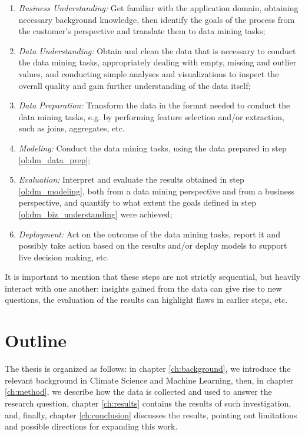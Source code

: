 \documentclass[a4paper,11pt]{kth-mag}
\begin{document}
\begin{enumerate}
\item \emph{Business Understanding:} Get familiar with the application domain, obtaining necessary background knowledge, then identify the goals of the process from the customer's perspective and translate them to data mining tasks;
\label{ol:dm_biz_understanding}

\item \emph{Data Understanding:} Obtain and clean the data that is necessary to conduct the data mining tasks, appropriately dealing with empty, missing and outlier values, and conducting simple analyses and visualizations to inspect the overall quality and gain further understanding of the data itself;
\label{ol:dm_data_understanding}

\item \emph{Data Preparation:} Transform the data in the format needed to conduct the data mining tasks, e.g. by performing feature selection and/or extraction, such as joins, aggregates, etc.
\label{ol:dm_data_prep}

\item \emph{Modeling:} Conduct the data mining tasks, using the data prepared in step \ref{ol:dm_data_prep};
\label{ol:dm_modeling}

\item \emph{Evaluation:} Interpret and evaluate the results obtained in step \ref{ol:dm_modeling}, both from a data mining perspective and from a business perspective, and quantify to what extent the goals defined in step \ref{ol:dm_biz_understanding} were achieved;
\label{ol:dm_eval}

\item \emph{Deployment:} Act on the outcome of the data mining tasks, report it and possibly take action based on the results and/or deploy models to support live decision making, etc.
\label{ol:deploy}
\end{enumerate}

It is important to mention that these steps are not strictly sequential, but heavily interact with one another: insights gained from the data can give rise to new questions, the evaluation of the results can highlight flaws in earlier steps, etc.


\section{Outline}
\label{sec:outline}
The thesis is organized as follows: in chapter \ref{ch:background}, we introduce the relevant background in Climate Science and Machine Learning, then, in chapter \ref{ch:method}, we describe how the data is collected and used to answer the research question, chapter \ref{ch:results} contains the results of such investigation, and, finally, chapter \ref{ch:conclusion} discusses the results, pointing out limitations and possible directions for expanding this work.
\end{document}
